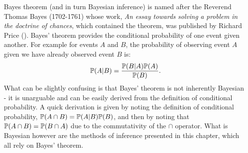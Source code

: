 Bayes theorem (and in turn Bayesian inference) is named after the Reverend Thomas Bayes (1702-1761) whose work,
\textit{An essay towards solving a problem in the doctrine of chances}, which contained the theorem, was published by
Richard Price (\cite{bayes1763}). Bayes' theorem provides the conditional probability of one event given another. For
example for events \(A\) and \(B\), the probability of observing event \(A\) given we have already observed event \(B\)
is:
\begin{align} 
\mathbb{P}(A | B) = \frac{\mathbb{P}(B | A) \mathbb{P}(A)}{\mathbb{P}(B)}.
\end{align}
What can be slightly confusing is that Bayes' theorem is not inherently Bayesian - it is unarguable and can be easily
derived from the definition of conditional probability. A quick derivation is given by noting the definition of
conditional probability, \(\mathbb{P}(A \cap B) = \mathbb{P}(A | B) \mathbb{P}(B)\), and then by noting that \(\mathbb{P}(A \cap B) =
\mathbb{P}(B \cap A)\) due to the commutativity of the \(\cap\) operator. What is Bayesian however are the methods of
inference presented in this chapter, which all rely on Bayes' theorem.

